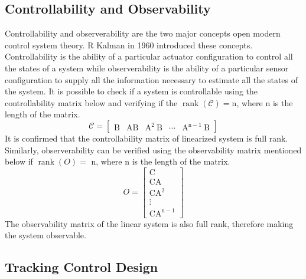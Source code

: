 \documentclass{UoNMCHA}
\numberwithin{equation}{section}
\begin{document}
	\subsection{Controllability and Observability}
	Controllability and observerability are the two major concepts open modern control system theory. $\mathrm{R}$ Kalman in 1960 introduced these concepts. Controllability is the ability of a particular actuator
	configuration to control all the states of a system while observerability is the ability of a particular
	sensor configuration to supply all the information necessary to estimate all the states of the system. It
	is possible to check if a system is controllable using the controllability matrix below and verifying if
	the $\operatorname{rank}(\mathcal{C})=\mathrm{n}$, where $\mathrm{n}$ is the length of the matrix.
	$$
	\mathcal{C}=\left[\begin{array}{lllll}
	\mathrm{B} & \mathrm{AB} & \mathrm{A}^{2} \mathrm{~B} & \cdots & \mathrm{A}^{\mathrm{n}-1} \mathrm{~B}
	\end{array}\right]
	$$
	It is confirmed that the controllability matrix of linearized system is full rank.
	Similarly, observerability can be verified using the observability matrix mentioned below if $\operatorname{rank}(O)=$
	$\mathrm{n}$, where $\mathrm{n}$ is the length of the matrix.
	$$
	O=\left[\begin{array}{c}
	\mathrm{C} \\
	\mathrm{CA} \\
	\mathrm{CA}^{2} \\
	\vdots \\
	\mathrm{CA}^{\mathrm{n}-1}
	\end{array}\right]
	$$
	The observability matrix of the linear system is also full rank, therefore making the system observable.
	
	\subsection{Tracking Control Design}\label{Tracking Control Design}
	
\end{document}
